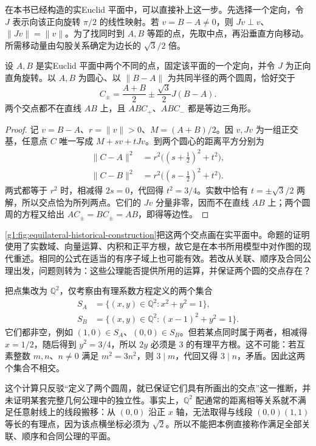 在本书已经构造的实Euclid 平面中，可以直接补上这一步。先选择一个定向，令 \(J\) 表示向该正向旋转 \(\pi/2\) 的线性映射。若 \(v=B-A\ne0\)，则 \(Jv\perp v\)、\(\lVert Jv\rVert=\lVert v\rVert\)。为了找同时到 \(A,B\) 等距的点，先取中点，再沿垂直方向移动。所需移动量由勾股关系确定为边长的 \(\sqrt3/2\) 倍。

\begin{proposition}\label{g1:prop:equilateral-coordinate-reconstruction}
	设 \(A,B\) 是实Euclid 平面中两个不同的点，固定该平面的一个定向，并令 \(J\) 为正向直角旋转。以 \(A,B\) 为圆心、以 \(\lVert B-A\rVert\) 为共同半径的两个圆周，恰好交于
	\begin{equation}\label{g1:eq:equilateral-coordinate-intersections}
		C_\pm=\frac{A+B}{2}\pm\frac{\sqrt3}{2}J(B-A).
	\end{equation}
	两个交点都不在直线 \(AB\) 上，且 \(ABC_+\)、\(ABC_-\) 都是等边三角形。
\end{proposition}
\begin{proof}
	记 \(v=B-A\)、\(r=\lVert v\rVert>0\)、\(M=(A+B)/2\)。因 \(v,Jv\) 为一组正交基，任意点 \(C\) 唯一写成 \(M+sv+tJv\)。到两个圆心的距离平方分别为
	\[
		\begin{aligned}
			\lVert C-A\rVert^2&=r^2\bigl((s+\tfrac12)^2+t^2\bigr),\\
			\lVert C-B\rVert^2&=r^2\bigl((s-\tfrac12)^2+t^2\bigr).
		\end{aligned}
	\]
	两式都等于 \(r^2\) 时，相减得 \(2s=0\)，代回得 \(t^2=3/4\)。实数中恰有 \(t=\pm\sqrt3/2\) 两解，所以交点恰为所列两点。它们的 \(Jv\) 分量非零，因而不在直线 \(AB\) 上；两个圆周的方程又给出 \(AC_\pm=BC_\pm=AB\)，即得等边性。
\end{proof}



\cref{g1:fig:equilateral-historical-construction}把这两个交点画在实平面中。命题的证明使用了实数域、向量运算、内积和正平方根，故它是在本书所用模型中对作图的现代重述。相同的公式在适当的有序子域上也可能有效。若改从关联、顺序及合同公理出发，问题则转为：这些公理能否提供所用的运算，并保证两个圆的交点存在？

\begin{example}\label{g1:exm:rational-circles-no-intersection}
	把点集改为 \(\mathbb Q^2\)，仅考察由有理系数方程定义的两个集合
	\[
		\begin{aligned}
			S_A&=\{(x,y)\in\mathbb Q^2:x^2+y^2=1\},\\
			S_B&=\{(x,y)\in\mathbb Q^2:(x-1)^2+y^2=1\}.
		\end{aligned}
	\]
	它们都非空，例如 \((1,0)\in S_A\)、\((0,0)\in S_B\)。但若某点同时属于两者，相减得 \(x=1/2\)，随后得到 \(y^2=3/4\)，所以 \(2y\) 必须是 \(3\) 的有理平方根。这不可能：若互素整数 \(m,n\)、\(n\ne0\) 满足 \(m^2=3n^2\)，则 \(3\mid m\)，代回又得 \(3\mid n\)，矛盾。因此这两个集合不相交。

	这个计算只反驳“定义了两个圆周，就已保证它们具有所画出的交点”这一推断，并未证明某套完整几何公理中的独立性。事实上，\(\mathbb Q^2\) 配通常的距离相等关系就不满足任意射线上的线段搬移：从 \((0,0)\) 沿正 \(x\) 轴，无法取得与线段 \((0,0)(1,1)\) 等长的有理点，因为该点横坐标必须为 \(\sqrt2\)。所以不能把本例直接称作满足全部关联、顺序和合同公理的平面。
\end{example}

